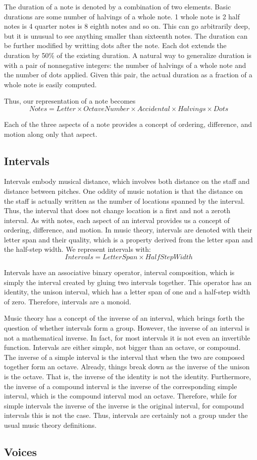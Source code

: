 The duration of a note is denoted by a combination of two elements.
Basic durations are some number of halvings of a whole note.
1 whole note is 2 half notes is 4 quarter notes is 8 eighth notes and so on.
This can go arbitrarily deep, but it is unusual to see anything smaller than sixteenth notes.
The duration can be further modified by writting dots after the note.
Each dot extends the duration by 50\% of the existing duration.
A natural way to generalize duration is with a pair of nonnegative integers: the number of halvings of a whole note and the number of dots applied.
Given this pair, the actual duration as a fraction of a whole note is easily computed.

Thus, our representation of a note becomes $$ Notes = Letter \times OctaveNumber \times Accidental \times Halvings \times Dots $$

Each of the three aspects of a note provides a concept of ordering, difference, and motion along only that aspect.

\subsection{Intervals}
Intervals embody musical distance, which involves both distance on the staff and distance between pitches.
One oddity of music notation is that the distance on the staff is actually written as the number of locations spanned by the interval.
Thus, the interval that does not change location is a first and not a zeroth interval.
As with notes, each aspect of an interval provides us a concept of ordering, difference, and motion.
In music theory, intervals are denoted with their letter span and their quality, which is a property derived from the letter span and the half-step width.
We represent intervals with: $$ Intervals = LetterSpan \times HalfStepWidth $$

Intervals have an associative binary operator, interval composition, which is simply the interval created by gluing two intervals together.
This operator has an identity, the unison interval, which has a letter span of one and a half-step width of zero.
Therefore, intervals are a monoid.

Music theory has a concept of the inverse of an interval, which brings forth the question of whether intervals form a group.
However, the inverse of an interval is not a mathematical inverse. In fact, for most intervals it is not even an invertible function.
Intervals are either simple, not bigger than an octave, or compound.
The inverse of a simple interval is the interval that when the two are composed together form an octave.
Already, things break down as the inverse of the unison is the octave. That is, the inverse of the identity is not the identity.
Furthermore, the inverse of a compound interval is the inverse of the corresponding simple interval, which is the compound interval mod an octave.
Therefore, while for simple intervals the inverse of the inverse is the original interval, for compound intervals this is not the case.
Thus, intervals are certainly not a group under the usual music theory definitions.

\subsection{Voices}
